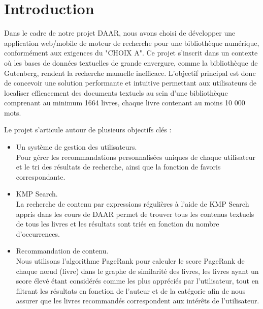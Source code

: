 \documentclass[11pt,english]{article}
\begin{document}
\pagebreak

\tableofcontents

\pagebreak
\large{
    \section{Introduction}
    
    \indent

    Dans le cadre de notre projet DAAR, nous avons choisi de développer une application web/mobile de moteur de recherche 
    pour une bibliothèque numérique, conformément aux exigences du "CHOIX A". 
    Ce projet s'inscrit dans un contexte où les bases de données textuelles de grande envergure, comme la bibliothèque de Gutenberg, 
    rendent la recherche manuelle inefficace. L'objectif principal est donc de concevoir une solution performante 
    et intuitive permettant aux utilisateurs de localiser efficacement des documents textuels au sein d'une bibliothèque comprenant au minimum 1664 livres, 
    chaque livre contenant au moins 10 000 mots.

    \indent
    Le projet s'articule autour de plusieurs objectifs clés :

    \begin{itemize}
        \item Un système de gestion des utilisateurs.
        \\
        Pour gérer les recommandations personnalisées uniques de chaque utilisateur et le tri des résultats de recherche, ainsi que la fonction de favoris correspondante.
        
        \item KMP Search.
        \\
        La recherche de contenu par expressions régulières à l'aide de KMP Search appris dans les cours de DAAR permet de trouver tous les contenus textuels de tous les livres et les résultats sont triés en fonction du nombre d'occurrences.
    
        \item Recommandation de contenu.
        \\
        Nous utilisons l'algorithme PageRank pour calculer le score PageRank de chaque nœud (livre) dans le graphe de similarité des livres, les livres ayant un score élevé étant considérés comme les plus appréciés par l'utilisateur, tout en filtrant les résultats en fonction de l'auteur et de la catégorie afin de nous assurer que les livres recommandés correspondent aux intérêts de l'utilisateur.
    

\end{itemize}}
\end{document}
